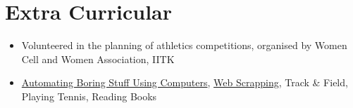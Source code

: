 \section*{\sc Extra Curricular}
\vspace{-2mm}
\hrulefill
\vspace{1mm}

\begin{itemize}
    \item Volunteered in the planning of athletics competitions, organised by Women Cell and Women Association, IITK
    \item \href{https://github.com/sunil-dhaka/automate-stuff-with-python}{\faGithub{} {Automating Boring Stuff Using Computers}}, \href{https://github.com/sunil-dhaka/python-webScrappers}{\faGithub{} {Web Scrapping}}, Track \& Field, Playing Tennis, Reading Books
\end{itemize}

